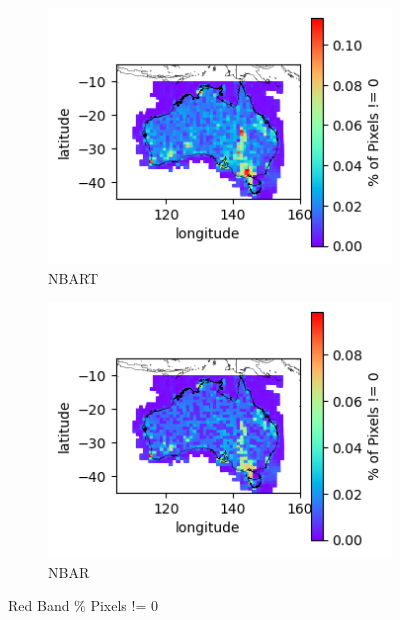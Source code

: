 \documentclass[a4paper]{article}
\begin{document}
      \begin{figure}[h!]
        \centering
          \begin{subfigure}[l]{.4\linewidth}
            \hspace{-32mm}
            \includegraphics[scale=0.9]{plots/nbart/nbart_red-PercentDifferent.png}
            \caption{NBART}
          \end{subfigure}
%
          \begin{subfigure}[r]{.4\linewidth}
            \includegraphics[scale=0.9]{plots/nbar/nbar_red-PercentDifferent.png}
            \caption{NBAR}
          \end{subfigure}
        \caption{Red Band \% Pixels != 0}\label{figure:26}
      \end{figure}

  \clearpage
\end{document}
